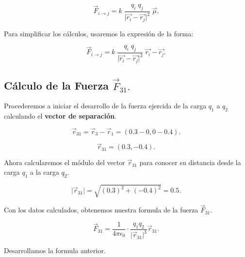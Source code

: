 \documentclass[a4paper,12pt]{article} %
\begin{document}
\[ \vec{F}_{i \rightarrow j} = k \; \frac{q_i \; q_j}{\vert \vec{r_i} - \vec{r_j}  \vert ^2} \; \vec{\mu}. \]

\vspace{\baselineskip}

\begin{justify}
	Para simplificar los cálculos, usaremos la expresión de la forma:
\end{justify}

\[ \boxed{\vec{F}_{i \rightarrow j} = k \; \frac{q_i \; q_j}{\vert \vec{r_i} - \vec{r_j}  \vert ^3} \; \vec{r_i} - \vec{r_j}.} \]

\subsection{Cálculo de la Fuerza \(\vec{F}_{31}.\)}

\vspace{\baselineskip}

\begin{justify}
	Procederemos a iniciar el desarrollo de la fuerza ejercida de la carga \(q_1\) a \(q_2\) calculando el \textbf{vector de separación}.
\end{justify}

\[ \vec{r}_{31} = \vec{r}_3 - \vec{r}_1 = (0.3 - 0 , 0 - 0.4).\]

\[ \vec{r}_{31} = (0.3 , -0.4). \]

\vspace{\baselineskip}

\begin{justify}
	Ahora calcularemos el módulo del vector \(\vec{r}_{31}\) para conocer su distancia desde la carga \(q_1\) a la carga \(q_2\).
\end{justify}

\[ \vert \vec{r}_{31} \vert = \sqrt{\left( 0.3 \right)^2 + \left( -0.4 \right)^2 } = 0.5. \]

\vspace{\baselineskip}

\begin{justify}
	Con los datos calculados, obtenemos nuestra formula de la fuerza  \(\vec{F}_{31}\).
\end{justify}

\[ \vec{F}_{31} = \frac{1}{4 \pi \epsilon_0} \cdot \frac{q_1 q_2}{\vert \vec{r}_{31} \vert^3} \vec{r}_{31}. \]

\vspace{\baselineskip}

\begin{justify}
	Desarrollamos la formula anterior.
\end{justify}
\end{document}

